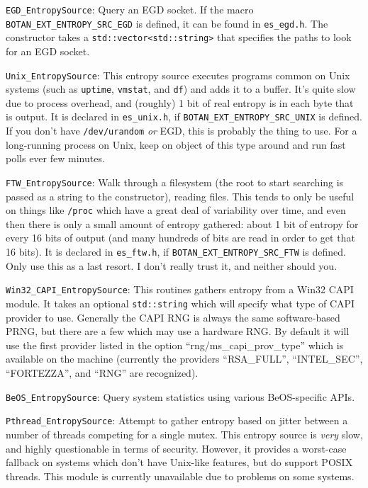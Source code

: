 \documentclass{article}
\newcommand{\filename}[1]{\texttt{#1}}
\newcommand{\macro}[1]{\texttt{#1}}
\newcommand{\type}[1]{\texttt{#1}}
\begin{document}
\noindent
\type{EGD\_EntropySource}: Query an EGD socket. If the macro
\macro{BOTAN\_EXT\_ENTROPY\_SRC\_EGD} is defined, it can be found in
\filename{es\_egd.h}. The constructor takes a \type{std::vector<std::string>}
that specifies the paths to look for an EGD socket.

\noindent
\type{Unix\_EntropySource}: This entropy source executes programs common on
Unix systems (such as \filename{uptime}, \filename{vmstat}, and \filename{df})
and adds it to a buffer. It's quite slow due to process overhead, and (roughly)
1 bit of real entropy is in each byte that is output. It is declared in
\filename{es\_unix.h}, if \macro{BOTAN\_EXT\_ENTROPY\_SRC\_UNIX} is
defined. If you don't have \filename{/dev/urandom} \emph{or} EGD, this is
probably the thing to use. For a long-running process on Unix, keep on object
of this type around and run fast polls ever few minutes.

\noindent
\type{FTW\_EntropySource}: Walk through a filesystem (the root to start
searching is passed as a string to the constructor), reading files. This tends
to only be useful on things like \filename{/proc} which have a great deal of
variability over time, and even then there is only a small amount of entropy
gathered: about 1 bit of entropy for every 16 bits of output (and many hundreds
of bits are read in order to get that 16 bits). It is declared in
\filename{es\_ftw.h}, if \macro{BOTAN\_EXT\_ENTROPY\_SRC\_FTW} is defined. Only
use this as a last resort. I don't really trust it, and neither should you.

\noindent
\type{Win32\_CAPI\_EntropySource}: This routines gathers entropy from a Win32
CAPI module. It takes an optional \type{std::string} which will specify what
type of CAPI provider to use. Generally the CAPI RNG is always the same
software-based PRNG, but there are a few which may use a hardware RNG. By
default it will use the first provider listed in the option
``rng/ms\_capi\_prov\_type'' which is available on the machine (currently the
providers ``RSA\_FULL'', ``INTEL\_SEC'', ``FORTEZZA'', and ``RNG'' are
recognized).

\noindent
\type{BeOS\_EntropySource}: Query system statistics using various BeOS-specific
APIs.

\noindent
\type{Pthread\_EntropySource}: Attempt to gather entropy based on jitter
between a number of threads competing for a single mutex. This entropy source
is \emph{very} slow, and highly questionable in terms of security. However, it
provides a worst-case fallback on systems which don't have Unix-like features,
but do support POSIX threads. This module is currently unavailable due to
problems on some systems.
\end{document}
